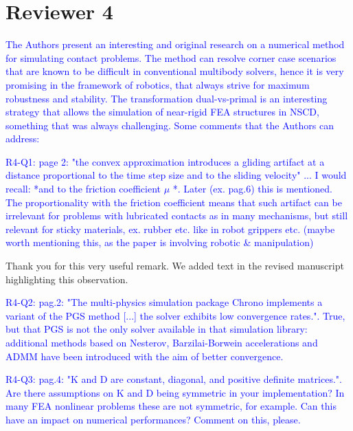 \section{Reviewer 4}
\label{sec:reviewer_4}

\textcolor{blue}{
The Authors present an interesting and original research on a numerical
method for simulating contact problems. The method can resolve corner
case scenarios that are known to be difficult in conventional multibody
solvers, hence it is very promising in the framework of robotics, that
always strive for maximum robustness and stability. The transformation
dual-vs-primal is an interesting strategy that allows the simulation of
near-rigid FEA structures in NSCD, something that was always
challenging.
Some comments that the Authors can address:
}
\vspace{5mm}

\textcolor{blue}{R4-Q1: page 2: "the convex approximation introduces a gliding
artifact at a distance proportional to the time step size and to the sliding
velocity" ... I would recall: *and to the friction coefficient $\mu$ *. Later
(ex. pag.6) this is mentioned. The proportionality with the friction coefficient
means that such artifact can be irrelevant for problems with lubricated contacts
as in many mechanisms, but still relevant for sticky materials, ex. rubber etc.
like in robot grippers etc. (maybe worth mentioning this, as the paper is
involving robotic \& manipulation)}

Thank you for this very useful remark. We added text in the revised manuscript
highlighting this observation.

\vspace{5mm}

\textcolor{blue}{R4-Q2: pag.2: "The multi-physics simulation package Chrono implements a
variant of the PGS method [...] the solver exhibits low convergence
rates.". True, but that PGS is not the only solver available in that
simulation library: additional methods based on Nesterov,
Barzilai-Borwein accelerations and ADMM have been introduced with the
aim of better convergence.}


\vspace{5mm}

\textcolor{blue}{R4-Q3: pag.4: "K and D are constant, diagonal, and positive
definite matrices.". Are there assumptions on K and D being symmetric in your
implementation? In many FEA nonlinear problems these are not symmetric, for
example. Can this have an impact on numerical performances? Comment on this,
please.}

